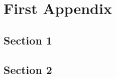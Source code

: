   \printreferences 


\bigskip 
\clearpage

 \singlespacing                %
 
\printbibliography[heading=bibintoc]
\bigskip

\appendix
 \truedoublespacing            %

\chapter{First Appendix}\label{app:}
  \section{Section 1}\label{sec:}
    \lipsum[34-36]
  \section{Section 2}\label{sec:}
    \lipsum[38]


